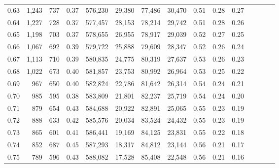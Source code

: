 \begin{tabular}{rrrcrrrrrrrrrrr}
0.63 &   1,243 &     737 &                                       0.37 &  576,230 &   29,380 &   77,486 &   30,470 &  0.51 &  0.28 &                         0.27 \\
0.64 &   1,227 &     728 &                                       0.37 &  577,457 &   28,153 &   78,214 &   29,742 &  0.51 &  0.28 &                         0.26 \\
0.65 &   1,198 &     703 &                                       0.37 &  578,655 &   26,955 &   78,917 &   29,039 &  0.52 &  0.27 &                         0.25 \\
0.66 &   1,067 &     692 &                                       0.39 &  579,722 &   25,888 &   79,609 &   28,347 &  0.52 &  0.26 &                         0.24 \\
0.67 &   1,113 &     710 &                                       0.39 &  580,835 &   24,775 &   80,319 &   27,637 &  0.53 &  0.26 &                         0.23 \\
0.68 &   1,022 &     673 &                                       0.40 &  581,857 &   23,753 &   80,992 &   26,964 &  0.53 &  0.25 &                         0.22 \\
0.69 &     967 &     650 &                                       0.40 &  582,824 &   22,786 &   81,642 &   26,314 &  0.54 &  0.24 &                         0.21 \\
0.70 &     985 &     595 &                                       0.38 &  583,809 &   21,801 &   82,237 &   25,719 &  0.54 &  0.24 &                         0.20 \\
0.71 &     879 &     654 &                                       0.43 &  584,688 &   20,922 &   82,891 &   25,065 &  0.55 &  0.23 &                         0.19 \\
0.72 &     888 &     633 &                                       0.42 &  585,576 &   20,034 &   83,524 &   24,432 &  0.55 &  0.23 &                         0.19 \\
0.73 &     865 &     601 &                                       0.41 &  586,441 &   19,169 &   84,125 &   23,831 &  0.55 &  0.22 &                         0.18 \\
0.74 &     852 &     687 &                                       0.45 &  587,293 &   18,317 &   84,812 &   23,144 &  0.56 &  0.21 &                         0.17 \\
0.75 &     789 &     596 &                                       0.43 &  588,082 &   17,528 &   85,408 &   22,548 &  0.56 &  0.21 &                         0.16 \\

\end{tabular}
